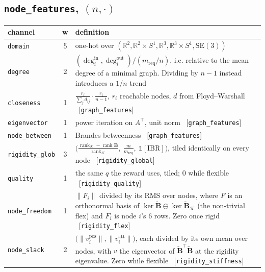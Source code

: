 \documentclass[11pt,a4paper]{article}
\newcommand{\R}{\mathbb{R}}
\newcommand{\SEthree}{\mathrm{SE}(3)}
\newcommand{\rk}{\operatorname{rank}}
\newcommand{\B}{\mathbf{B}}
\newcommand{\Bs}{\widetilde{\mathbf{B}}}
\begin{document}
\subsection*{\texttt{node\_features}, $(n,\cdot)$}
\begin{longtable}{p{2.9cm}cp{9.4cm}}
\toprule
channel & w & definition \\
\midrule
\endhead
\texttt{domain} & 5 & one-hot over $(\R^2,\R^2\!\times\!S^1,\R^3,\R^3\!\times\!S^1,\SEthree)$ \\
\texttt{degree} & 2 & $(\deg^{\text{in}}_i,\deg^{\text{out}}_i)\big/(m_{\text{req}}/n)$, i.e. relative to the mean degree of a minimal graph. Dividing by $n-1$ instead introduces a $1/n$ trend \\
\texttt{closeness} & 1 & $\frac{r_i}{\sum_j d_{ij}}\cdot\frac{r_i}{n-1}$, $r_i$ reachable nodes, $d$ from Floyd--Warshall \ [\texttt{graph\_features}] \\
\texttt{eigenvector} & 1 & power iteration on $A^{\!\top}$, unit norm \ [\texttt{graph\_features}] \\
\texttt{node\_between} & 1 & Brandes betweenness \ [\texttt{graph\_features}] \\
\texttt{rigidity\_glob} & 3 & $\big(\tfrac{\rk_{\mathcal K}-\rk\B}{\rk_{\mathcal K}},\ \tfrac{m}{m_{\text{req}}},\ \mathbb 1[\text{IBR}]\big)$, tiled identically on every node \ [\texttt{rigidity\_global}] \\
\texttt{quality} & 1 & the same $q$ the reward uses, tiled; $0$ while flexible \ [\texttt{rigidity\_quality}] \\
\texttt{node\_freedom} & 1 & $\|F_i\|$ divided by its RMS over nodes, where $F$ is an orthonormal basis of $\ker\Bs\ominus\ker\Bs_{\mathcal K}$ (the non-trivial flex) and $F_i$ is node $i$'s $6$ rows. Zero once rigid \ [\texttt{rigidity\_flex}] \\
\texttt{node\_slack} & 2 & $\big(\|v_i^{\text{pos}}\|,\|v_i^{\text{att}}\|\big)$, each divided by its own mean over nodes, with $v$ the eigenvector of $\Bs^{\!\top}\Bs$ at the rigidity eigenvalue. Zero while flexible \ [\texttt{rigidity\_stiffness}] \\
\bottomrule
\end{longtable}
\end{document}
